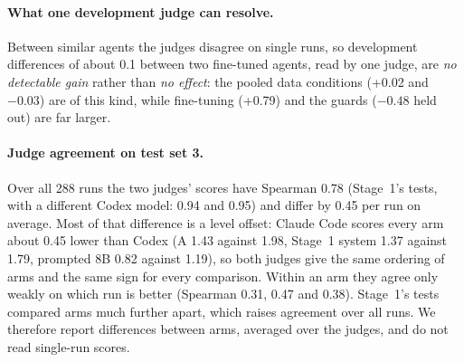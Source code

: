 \documentclass[11pt]{article}
\begin{document}
\paragraph{What one development judge can resolve.} Between similar agents the judges disagree on single runs, so
development differences of about 0.1 between two fine-tuned agents, read by one judge, are \emph{no detectable gain}
rather than \emph{no effect}: the pooled data conditions (+0.02 and $-0.03$) are of this kind, while fine-tuning
(+0.79) and the guards ($-0.48$ held out) are far larger.

\paragraph{Judge agreement on test set 3.} Over all 288 runs the two judges' scores have Spearman 0.78 (Stage~1's
tests, with a different Codex model: 0.94 and 0.95) and differ by 0.45 per run on average. Most of that difference is a level offset: Claude Code
scores every arm about 0.45 lower than Codex (A 1.43 against 1.98, Stage~1 system 1.37 against 1.79, prompted 8B 0.82
against 1.19), so both judges give the same ordering of arms and the same sign for every comparison. Within an arm
they agree only weakly on which run is better (Spearman 0.31, 0.47 and 0.38). Stage~1's tests compared arms much
further apart, which raises agreement over all runs. We therefore report differences between arms, averaged over the
judges, and do not read single-run scores.
\end{document}
